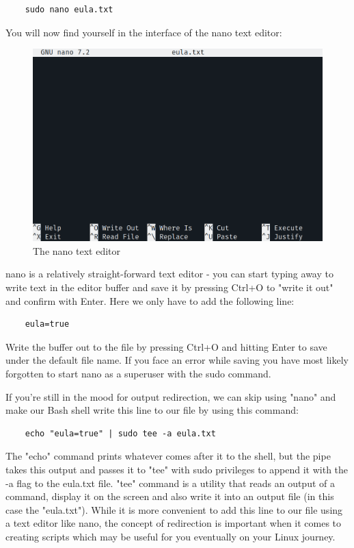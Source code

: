 \documentclass[]{article}
\begin{document}
\begin{verbatim}
	sudo nano eula.txt
\end{verbatim}

You will now find yourself in the interface of the nano text editor:

\begin{figure}[h!]
	\caption{The nano text editor}
	\centering
	\includegraphics[width=1\textwidth]{nano}
\end{figure}
\FloatBarrier

nano is a relatively straight-forward text editor - you can start typing away to write text in the editor buffer and save it by pressing Ctrl+O to "write it out" and confirm with Enter. Here we only have to add the following line:

\begin{verbatim}
	eula=true
\end{verbatim}

Write the buffer out to the file by pressing Ctrl+O and hitting Enter to save under the default file name. If you face an error while saving you have most likely forgotten to start nano as a superuser with the sudo command.

If you're still in the mood for output redirection, we can skip using "nano" and make our Bash shell write this line to our file by using this command:

\begin{verbatim}
	echo "eula=true" | sudo tee -a eula.txt
\end{verbatim}

The "echo" command prints whatever comes after it to the shell, but the pipe takes this output and passes it to "tee" with sudo privileges to append it with the -a flag to the eula.txt file. "tee" command is a utility that reads an output of a command, display it on the screen and also write it into an output file (in this case the "eula.txt"). While it is more convenient to add this line to our file using a text editor like nano, the concept of redirection is important when it comes to creating scripts which may be useful for you eventually on your Linux journey.
\end{document}
